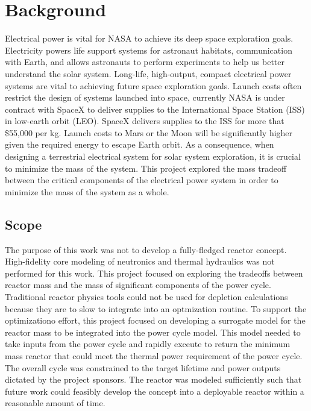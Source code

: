 \section{Background}
Electrical power is vital for NASA to achieve its deep space exploration goals.
Electricity powers life support systems for astronaut habitats, communication
with Earth, and allows astronauts to perform experiments to help us better
understand the solar system. Long-life, high-output, compact electrical power
systems are vital to achieving future space exploration goals. Launch costs 
often restrict the design of systems launched
into space, currently NASA is under contract with SpaceX to deliver supplies to
the International Space Station (ISS) in low-earth orbit (LEO). SpaceX delivers
supplies to the ISS for more that \$55,000 per kg. Launch costs to Mars or the
Moon will be significantly higher given the required energy to escape Earth
orbit. As a consequence, when designing a terrestrial electrical system for
solar system exploration, it is crucial to minimize the mass of the system. This
project explored the mass tradeoff between the critical components of the
electrical power system in order to minimize the mass of the system as a whole.

\subsection{Scope}
The purpose of this work was not to develop a fully-fledged reactor concept.
High-fidelity core modeling of neutronics and thermal hydraulics was not
performed for this work.
This project focused on exploring the tradeoffs between reactor mass and the
mass of significant components of the power cycle. Traditional reactor physics
tools could not be used for depletion calculations because they are to slow to
integrate into an optmization routine. To support the optimizationo effort, this project focused on
developing a surrogate model for the reactor mass to be integrated into the
power cycle model. This model needed to take inputs from the power cycle and
rapidly exceute to return the minimum mass reactor that could meet the thermal
power requirement of the power cycle. The overall cycle was constrained to the
target lifetime and power outputs dictated by the project sponsors. The reactor
was modeled sufficiently such that future work could feasibly develop the
concept into a deployable reactor within a reasonable amount of time.

